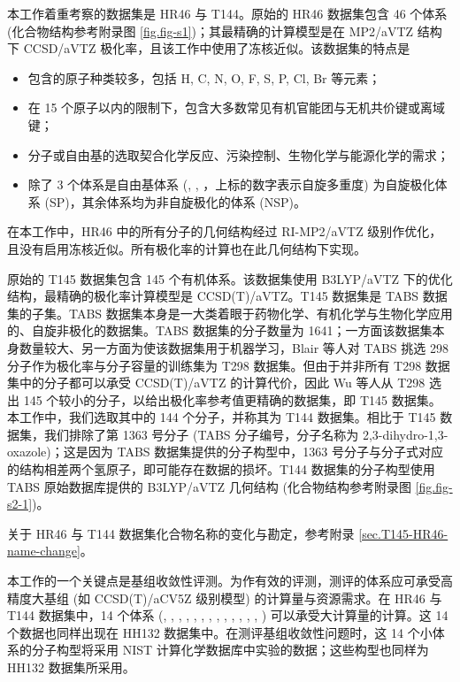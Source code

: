 本工作着重考察的数据集是 HR46 与 T144。原始的 HR46 数据集\cite{Hickey-Rowley.JPCA.2014}包含 46 个体系 (化合物结构参考附录图 \ref{fig.fig-s1})；其最精确的计算模型是在 MP2/aVTZ 结构下 CCSD/aVTZ 极化率，且该工作中使用了冻核近似。该数据集的特点是
\begin{itemize}[nosep]
    \item 包含的原子种类较多，包括 H, C, N, O, F, S, P, Cl, Br 等元素；
    \item 在 15 个原子以内的限制下，包含大多数常见有机官能团与无机共价键或离域键；
    \item 分子或自由基的选取契合化学反应、污染控制、生物化学与能源化学的需求；
    \item 除了 3 个体系是自由基体系 (, , ，上标的数字表示自旋多重度) 为自旋极化体系 (SP)，其余体系均为非自旋极化的体系 (NSP)。
\end{itemize}
在本工作中，HR46 中的所有分子的几何结构经过 RI-MP2/aVTZ 级别作优化，且没有启用冻核近似。所有极化率的计算也在此几何结构下实现。

原始的 T145 数据集\cite{Wu-Thakkar.CPL.2015}包含 145 个有机体系。该数据集使用 B3LYP/aVTZ 下的优化结构，最精确的极化率计算模型是 CCSD(T)/aVTZ。T145 数据集是 TABS 数据集\cite{Blair-Thakkar.CTC.2014}的子集。TABS 数据集本身是一大类着眼于药物化学、有机化学与生物化学应用的、自旋非极化的数据集。TABS 数据集的分子数量为 1641；一方面该数据集本身数量较大、另一方面为使该数据集用于机器学习，Blair 等人对 TABS 挑选 298 分子作为极化率与分子容量的训练集为 T298 数据集\cite{Blair-Thakkar.CPL.2014}。但由于并非所有 T298 数据集中的分子都可以承受 CCSD(T)/aVTZ 的计算代价，因此 Wu 等人从 T298 选出 145 个较小的分子，以给出极化率参考值更精确的数据集，即 T145 数据集\cite{Wu-Thakkar.CPL.2015}。本工作中，我们选取其中的 144 个分子，并称其为 T144 数据集。相比于 T145 数据集，我们排除了第 1363 号分子 (TABS 分子编号，分子名称为 2,3-dihydro-1,3-oxazole)；这是因为 TABS 数据集提供的分子构型中，1363 号分子与分子式对应的结构相差两个氢原子，即可能存在数据的损坏。T144 数据集的分子构型使用 TABS 原始数据库提供的 B3LYP/aVTZ 几何结构\cite{Blair-Thakkar.CTC.2014} (化合物结构参考附录图 \ref{fig.fig-s2-1})。

关于 HR46 与 T144 数据集化合物名称的变化与勘定，参考附录 \ref{sec.T145-HR46-name-change}。

本工作的一个关键点是基组收敛性评测。为作有效的评测，测评的体系应可承受高精度大基组 (如 CCSD(T)/aCV5Z 级别模型) 的计算量与资源需求。在 HR46 与 T144 数据集中，14 个体系 (, , , , , , , , , , , , , ) 可以承受大计算量的计算。这 14 个数据也同样出现在 HH132 数据集中。在测评基组收敛性问题时，这 14 个小体系的分子构型将采用 NIST 计算化学数据库中实验的数据\cite{NIST.CCCBDB}；这些构型也同样为 HH132 数据集所采用。

